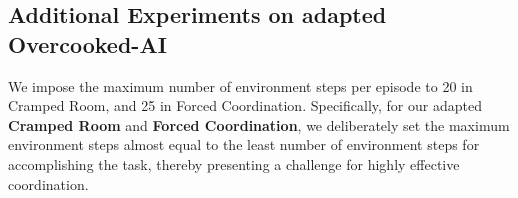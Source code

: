 \documentclass[11pt]{article}
\theoremstyle{plain}
\theoremstyle{remark}
\begin{document}
\begin{table}[h!]
\vskip -0.1in
\caption{Overview of the key properties that distinguish four methods. () \textbf{State Type}: whether the environment state included in the prompt is global or not; () \textbf{Planning Scheme}: whether LLM output plans sequentially or not; () \textbf{History Info}: whether all the history before is reserved in the prompt or not.}
\vspace{-0.5em}
\begin{center}
\end{center}
\label{prompt-compose}
\vskip -0.2in
\end{table}

\subsection{Additional Experiments on adapted Overcooked-AI}\label{appendix:overcooked_results}
We impose the maximum number of environment steps per episode to 20 in Cramped Room, and 25 in Forced Coordination. Specifically, for our adapted \textbf{Cramped Room} and \textbf{Forced Coordination}, we deliberately set the maximum environment steps almost equal to the least number of environment steps for accomplishing the task, thereby presenting a challenge for highly effective coordination. 
\end{document}
